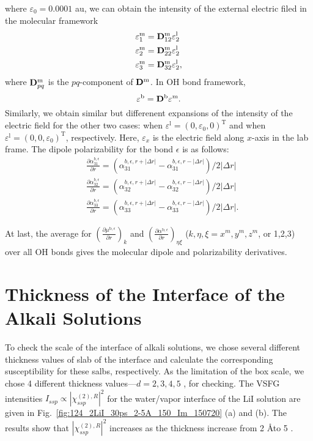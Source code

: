 where $\varepsilon_0 = 0.0001$ au, we can obtain the intensity of the external electric filed in the molecular framework  
\begin{subequations}
  \begin{align}
    &\varepsilon^\text{m}_1 = {\bf D}^{\text{m}}_{12} \varepsilon^\text{l}_2\\
    &\varepsilon^\text{m}_2 = {\bf D}^{\text{m}}_{22} \varepsilon^\text{l}_2\\
    &\varepsilon^\text{m}_3 = {\bf D}^{\text{m}}_{32} \varepsilon^\text{l}_2,
    \end{align}
\end{subequations}
where ${\bf D}^{\text{m}}_{pq}$ is the $pq$-component of ${\bf D}^\text{m}$.
%
In OH bond framework,  
\begin{equation}
  \varepsilon^{\text b} = {\bf D}^{\text b} \varepsilon^{\text{m}}.
\end{equation}
Similarly, we obtain similar but differenent expansions of the intensity of the electric field for the other two cases: 
when $\varepsilon^{\text{l}} = (0,\varepsilon_0, 0)^\text{T}$ and when $\varepsilon^{\text{l}} = (0,0,\varepsilon_0)^\text{T}$, respectively.
Here, $\varepsilon_x$ is the electric field along $x$-axis in the lab frame. 
    The dipole polarizability for the bond ${\epsilon}$ is as follows:
\begin{subequations}
  \begin{align}
    &\frac{\partial \alpha^{b,\epsilon}_{31}}{\partial r} = (\alpha^{b,\epsilon,r+|\Delta r|}_{31} -\alpha^{b,\epsilon,r-|\Delta r|}_{31})/2|\Delta r|\\
    &\frac{\partial \alpha^{b,\epsilon}_{32}}{\partial r} = (\alpha^{b,\epsilon,r+|\Delta r|}_{32} -\alpha^{b,\epsilon,r-|\Delta r|}_{32})/2|\Delta r|\\
    &\frac{\partial \alpha^{b,\epsilon}_{33}}{\partial r} = (\alpha^{b,\epsilon,r+|\Delta r|}_{33} -\alpha^{b,\epsilon,r-|\Delta r|}_{33})/2|\Delta r|.
  \end{align}
\end{subequations}

At last, the average for $(\frac{\partial \mu^{\text{b},\epsilon}}{\partial r})_k$ and $(\frac{\partial \alpha^{\text{b},\epsilon}}{\partial r})_{\eta\xi}$ 
($k,\eta,\xi = x^m, y^m, z^m$, or 1,2,3) over all OH bonds gives the molecular dipole and polarizability derivatives. 


\section{Thickness of the Interface of the Alkali Solutions} \label{thickness_interface}
To check the scale of the interface of alkali solutions, we chose several different thickness values 
of slab of the interface and calculate the corresponding susceptibility for these salbs, respectively.
As the limitation of the box scale, we chose 4 different thickness values---$d=2,3,4,5$ \A, for checking. 
The VSFG intensities $I_{ssp} \propto |\chi^{(2),R}_{ssp}|^2$ for the water/vapor interface of the LiI solution
are given in Fig.~\ref{fig:124_2LiI_30ps_2-5A_150_Im_150720} (a) and (b).
The results show that $|\chi^{(2),R}_{ssp}|^2$ increases 
as the thickness increase from 2 \AA to 5 \A. 

